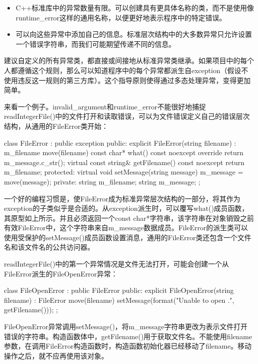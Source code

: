 \begin{itemize}
\item
C++标准库中的异常数量有限。可以创建具有更具体名称的类，而不是使用像runtime\_error这样的通用名称，以便更好地表示程序中的特定错误。

\item
可以向这些异常中添加自己的信息。标准层次结构中的大多数异常只允许设置一个错误字符串，而我们可能期望传递不同的信息。
\end{itemize}

建议自定义的所有异常类，都直接或间接地从标准异常类继承。如果项目中的每个人都遵循这个规则，那么可以知道程序中的每个异常都派生自exception（假设不使用违反这一规则的第三方库）。这个指导原则使得通过多态处理异常，变得更加简单。

来看一个例子。invalid\_argument和runtime\_error不能很好地捕捉readIntegerFile()中的文件打开和读取错误，可以为文件错误定义自己的错误层次结构，从通用的FileError类开始：

\begin{cpp}
class FileError : public exception
{
    public:
        explicit FileError(string filename) : m_filename { move(filename) } {}
        const char* what() const noexcept override { return m_message.c_str(); }
        virtual const string& getFilename() const noexcept { return m_filename; }
    protected:
        virtual void setMessage(string message) { m_message = move(message); }
    private:
        string m_filename;
        string m_message;
};
\end{cpp}

一个好的编程习惯是，使FileError成为标准异常层次结构的一部分，将其作为exception的子类似乎是合适的。从exception派生时，可以覆写what()成员函数，其原型如上所示。并且必须返回一个const char*字符串，该字符串在对象销毁之前有效FileError中，这个字符串来自m\_message数据成员。FileError的派生类可以使用受保护的setMessage()成员函数设置消息，通用的FileError类还包含一个文件名和该文件名的公共访问器。

readIntegerFile()中的第一个异常情况是文件无法打开，可能会创建一个从FileError派生的FileOpenError异常：

\begin{cpp}
class FileOpenError : public FileError
{
    public:
    explicit FileOpenError(string filename) : FileError { move(filename) }
    {
        setMessage(format("Unable to open {}.", getFilename()));
    }
};
\end{cpp}

FileOpenError异常调用setMessage()，将m\_message字符串更改为表示文件打开错误的字符串。构造函数体中，getFilename()用于获取文件名。不能使用filename参数，在调用FileError构造函数时，构造函数初始化器已经移动了filename。移动操作之后，就不应再使用该对象。

